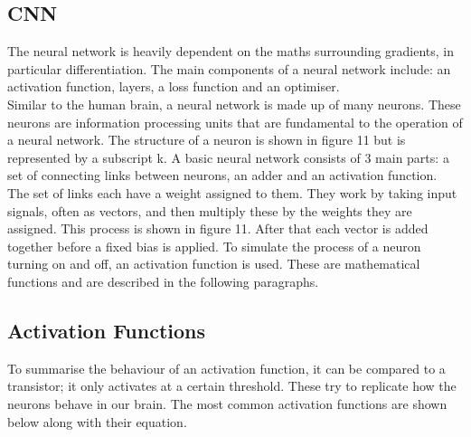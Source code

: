\documentclass{article}
\begin{document}
\subsection{CNN}
The neural network is heavily dependent on the maths surrounding gradients, in particular differentiation. The main components of a neural network include: an activation function, layers, a loss function and an optimiser.
\\
Similar to the human brain, a neural network is made up of many neurons. These neurons are information processing units that are fundamental to the operation of a neural network. The structure of a neuron is shown in figure 11 but is represented by a subscript k.  A basic neural network consists of 3 main parts: a set of connecting links between neurons, an adder and an activation function.
\\
The set of links each have a weight assigned to them. They work by taking input signals, often as vectors, and then multiply these by the weights they are assigned. This process is shown in figure 11. After that each vector is added together before a fixed bias is applied. To simulate the process of a neuron turning on and off, an activation function is used. These are mathematical functions and are described in the following paragraphs.

\subsection{Activation Functions}
To summarise the behaviour of an activation function, it can be compared to a transistor; it only activates at a certain threshold.  These try to replicate how the neurons behave in our brain.
The most common activation functions are shown below along with their equation.
\end{document}
